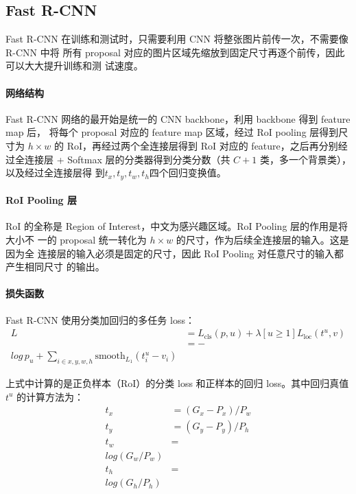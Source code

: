 \subsection{Fast R-CNN}\label{subsec:Fast-R-CNN}

Fast R-CNN 在训练和测试时，只需要利用 CNN 将整张图片前传一次，不需要像 R-CNN 中将
所有 proposal 对应的图片区域先缩放到固定尺寸再逐个前传，因此可以大大提升训练和测
试速度。

\paragraph{网络结构}
Fast R-CNN 网络的最开始是统一的 CNN backbone，利用 backbone 得到 feature map 后，
将每个 proposal 对应的 feature map 区域，经过 RoI pooling 层得到尺寸为 $h \times
w$ 的 RoI，再经过两个全连接层得到 RoI 对应的 feature，之后再分别经过全连接层 +
Softmax 层的分类器得到分类分数（共 $C+1$ 类，多一个背景类），以及经过全连接层得
到$t_x, t_y, t_w, t_h$四个回归变换值。

\paragraph{RoI Pooling 层}
RoI 的全称是 Region of Interest，中文为感兴趣区域。RoI Pooling 层的作用是将大小不
一的 proposal 统一转化为 $h \times w$ 的尺寸，作为后续全连接层的输入。这是因为全
连接层的输入必须是固定的尺寸，因此 RoI Pooling 对任意尺寸的输入都产生相同尺寸
的输出。

\paragraph{损失函数}
Fast R-CNN 使用分类加回归的多任务 loss：
\begin{align}
  L & = L_{\mathrm{cls}}(p, u) + \lambda [u \geq 1] L_{\mathrm{loc}}(t^u, v) \\
    & = -\\log\,p_u + \sum_{i \in {x, y, w, h}} \mathrm{smooth}_{L_1}(t_i^u - v_i)
\end{align}

上式中计算的是正负样本（RoI）的分类 loss 和正样本的回归 loss。其中回归真值 $t^u$
的计算方法为：
\begin{align}
  t_x & = (G_x - P_x) / P_w \\
  t_y & = (G_y - P_y) / P_h \\
  t_w & = \\log (G_w/P_w) \\
  t_h & = \\log (G_h/P_h)
\end{align}

